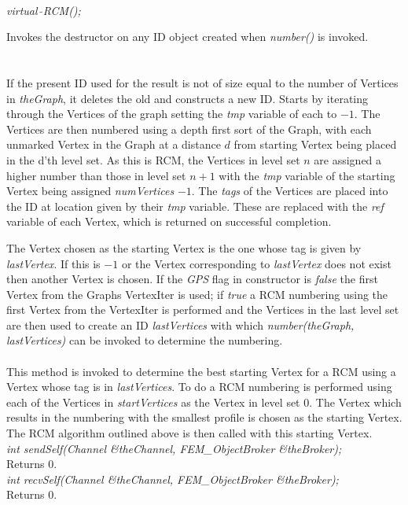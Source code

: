   \\
{\em virtual~$\tilde{}$RCM();}  

Invokes the destructor on any ID object created when {\em number()} is
invoked. \\

  \\
\\
If the present ID used for the result is not of size equal to the
number of Vertices in {\em theGraph}, it deletes the old and
constructs a new ID. Starts by iterating through the Vertices of the
graph setting the {\em tmp} variable of each to $-1$. The Vertices are
then numbered using a depth first sort of the Graph, with each
unmarked Vertex in the Graph at a distance $d$ from starting Vertex
being placed in the d'th level set. As this is RCM, the Vertices in
level set $n$ are assigned a higher number than those in level set
$n+1$ with the {\em tmp} variable of the starting Vertex being
assigned {\em numVertices} $-1$. The {\em tags} of the Vertices are
placed into the ID at location given by their {\em tmp} variable. These
are replaced with the {\em ref} variable of each Vertex, which is
returned on successful completion. 


The Vertex chosen as the starting Vertex is the one whose tag is given
by {\em lastVertex}. If this is $-1$ or the Vertex corresponding to
{\em lastVertex} does not exist then another Vertex is chosen. If the
{\em GPS} flag in constructor is {\em false} the first Vertex from the
Graphs VertexIter is used; if {\em true} a RCM numbering using the
first Vertex from the VertexIter is performed and the Vertices in the
last level set are then used to create an ID {\em lastVertices} with
which {\em number(theGraph, lastVertices)} can be invoked to determine
the numbering. \\


\\
This method is invoked to determine the best starting Vertex for a RCM
using a Vertex whose tag is in {\em lastVertices}. To do a RCM
numbering is performed using each of the Vertices in {\em
startVertices} as the Vertex in level set $0$. The Vertex which
results in the numbering with the smallest profile is chosen as 
the starting Vertex. The RCM algorithm outlined above is then called
with this starting Vertex. \\

{\em int sendSelf(Channel \&theChannel,
FEM\_ObjectBroker \&theBroker);} \\
Returns $0$. \\

{\em int recvSelf(Channel \&theChannel,
FEM\_ObjectBroker \&theBroker); } \\
Returns $0$.

